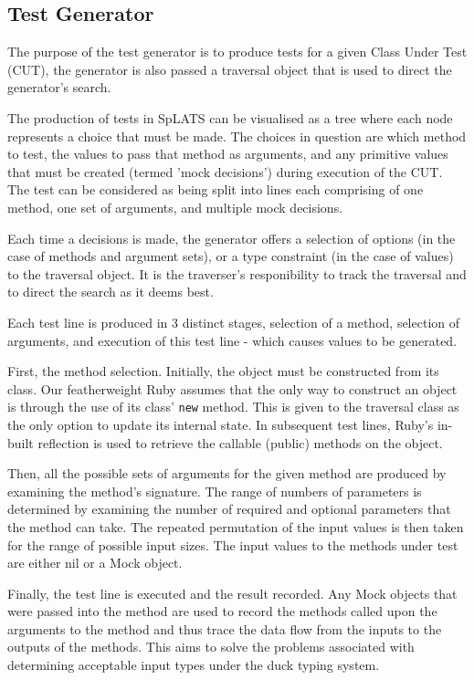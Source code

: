   \subsection{Test Generator}
    The purpose of the test generator is to produce tests for a given Class
Under Test (CUT), the generator is also passed a traversal object that is used
to direct the generator's search.

    The production of tests in SpLATS can be visualised as a tree where each
node represents a choice that must be made. The choices in question are which
method to test, the values to pass that method as arguments, and any primitive
values that must be created (termed 'mock decisions') during execution of the CUT.
    The test can be considered as being split into lines each comprising of one
method, one set of arguments, and multiple mock decisions.


    Each time a decisions is made, the generator offers a selection of options
(in the case of methods and argument sets), or a type constraint (in the case of
values) to the traversal object. It is the traverser's responibility to track
the traversal and to direct the search as it deems best.

    Each test line is produced in 3 distinct stages, selection of a method,
selection of arguments, and execution of this test line - which causes values to
be generated.

    First, the method selection. Initially, the object must be constructed from
its class. Our featherweight Ruby assumes that the only way to construct an
object is through the use of its class' \texttt{new} method. This is given to
the traversal class as the only option to update its internal state. In
subsequent test lines, Ruby's in-built reflection is used to retrieve the
callable (public) methods on the object.

    Then, all the possible sets of arguments for the given method are produced
by examining the method's signature. The range of numbers of parameters is
determined by examining the number of required and optional parameters that the
method can take. The repeated permutation of the input values is then taken
for the range of possible input sizes. The input values to the methods under
test are either nil or a Mock object.

    Finally, the test line is executed and the result recorded. Any Mock objects
that were passed into the method are used to record the methods called upon the
arguments to the method and thus trace the data flow from the inputs to the
outputs of the methods. This aims to solve the problems associated with
determining acceptable input types under the duck typing system.

